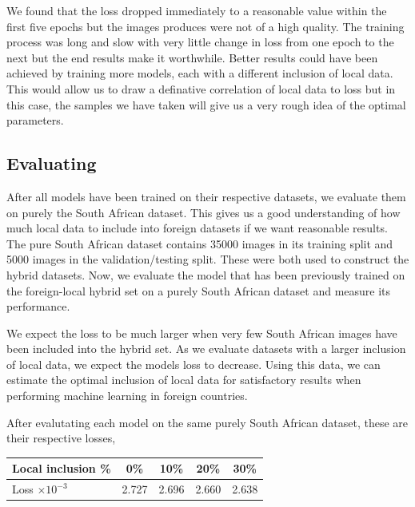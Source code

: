 \documentclass[conference]{IEEEtran}
\begin{document}
We found that the loss dropped immediately to a reasonable value within the first five epochs but the images produces were not of a high quality. The training process was long and slow with very little change in loss from one epoch to the next but the end results make it worthwhile. Better results could have been achieved by training more models, each with a different inclusion of local data. This would allow us to draw a definative correlation of local data to loss but in this case, the samples we have taken will give us a very rough idea of the optimal parameters.


\subsection{Evaluating}

After all models have been trained on their respective datasets, we evaluate them on purely the South African dataset. This gives us a good understanding of how much local data to include into foreign datasets if we want reasonable results. The pure South African dataset contains 35000 images in its training split and 5000 images in the validation/testing split. These were both used to construct the hybrid datasets. Now, we evaluate the model that has been previously trained on the foreign-local hybrid set on a purely South African dataset and measure its performance.

We expect the loss to be much larger when very few South African images have been included into the hybrid set. As we evaluate datasets with a larger inclusion of local data, we expect the models loss to decrease. Using this data, we can estimate the optimal inclusion of local data for satisfactory results when performing machine learning in foreign countries.

After evalutating each model on the same purely South African dataset, these are their respective losses,

\begin{table}[h]
\centering
\renewcommand{\arraystretch}{1.5}
\begin{tabular}{|l||c|c|c|c|}
\hline 
Local inclusion \% & 0\% & 10\% & 20\% & 30\%  \\
\hline
Loss $\times 10^{-3}$& 2.727 & 2.696 & 2.660 & 2.638\\ 
\hline 
\end{tabular} 
\end{table}
\end{document}
